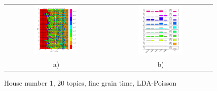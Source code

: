 \begin{figure}[h!]
 \centering
 \begin{tabular}{c c}
  \includegraphics[width=0.45\textwidth]{Pictures/Pois/fine/DayHN1TS48k20fine.png}
  &
  \includegraphics[width=0.45\textwidth]{Pictures/Pois/fine/TopHN1TS48k20fine.png}\\
  a) & b)
 \end{tabular}
  \caption{House number 1, 20 topics, fine grain time, LDA-Poisson}
  \label{fig:HN1Pois20fine}
\end{figure}


